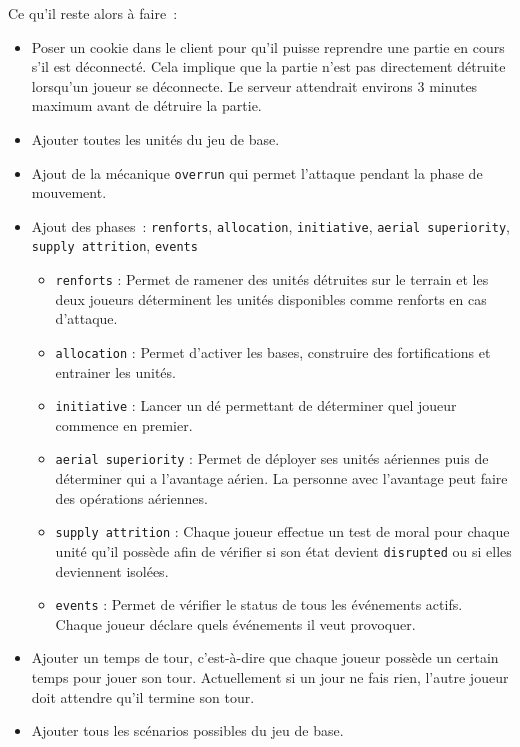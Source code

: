 Ce qu'il reste alors à faire :
\begin{itemize}
    \item Poser un cookie dans le client pour qu'il puisse reprendre une partie en cours s'il est déconnecté.
          Cela implique que la partie n'est pas directement détruite lorsqu'un joueur se déconnecte. Le serveur attendrait environs 3 minutes maximum avant de détruire la partie.
    \item Ajouter toutes les unités du jeu de base.
    \item Ajout de la mécanique {\tt overrun} qui permet l'attaque pendant la phase de mouvement.
    \item Ajout des phases : {\tt renforts}, {\tt allocation}, {\tt initiative}, {\tt aerial superiority}, {\tt supply attrition}, {\tt events}
          \begin{itemize}
              \item {\tt renforts} : Permet de ramener des unités détruites sur le terrain et les deux joueurs déterminent les unités disponibles comme renforts en cas d'attaque.
              \item {\tt allocation} : Permet d'activer les bases, construire des fortifications et entrainer les unités.
              \item {\tt initiative} : Lancer un dé permettant de déterminer quel joueur commence en premier.
              \item {\tt aerial superiority} : Permet de déployer ses unités aériennes puis de déterminer qui a l'avantage aérien.
                    La personne avec l'avantage peut faire des opérations aériennes.
              \item {\tt supply attrition} : Chaque joueur effectue un test de moral pour chaque unité qu'il possède afin de vérifier si son état devient {\tt disrupted} ou si elles deviennent isolées.
              \item {\tt events} : Permet de vérifier le status de tous les événements actifs. Chaque joueur déclare quels événements il veut provoquer.
          \end{itemize}
    \item Ajouter un temps de tour, c'est-à-dire que chaque joueur possède un certain temps pour jouer son tour. Actuellement si un jour ne fais rien, l'autre joueur doit attendre qu'il termine son tour.
    \item Ajouter tous les scénarios possibles du jeu de base.
\end{itemize}
